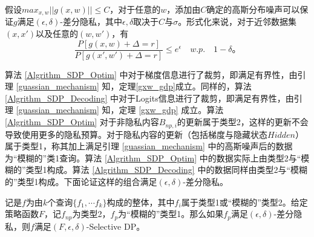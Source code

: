 \begin{theorem}
	\label{gxw_gdp}
	假设$max_{x,w}||g(x,w)||\leq C$，对于任意的$w$，添加由$C$确定的高斯分布噪声可以保证$g$满足$(\epsilon, \delta)$-差分隐私，其中$\epsilon, \delta$取决于$C$与$\sigma$。形式化来说，对于近邻数据集$(x, x')$以及任意的$(w, w')$，有
	$$\frac{P[g(x,w) + \Delta = r]}{P[g(x',w') + \Delta = r]}\leq e^\epsilon \quad w.p.\quad1-\delta\text{。}$$
\end{theorem}

算法 \ref{Algrithm_SDP_Optim} 中对于梯度信息进行了裁剪，即满足有界性，由引理 \ref{guassian_mechanism} 知，定理\ref{gxw_gdp}成立。同样的，算法 \ref{Algrithm_SDP_Decoding} 中对于Logits信息进行了裁剪，即满足有界性，由引理 \ref{guassian_mechanism} 知，定理 \ref{gxw_gdp} 成立。算法 \ref{Algrithm_SDP_Optim} 对于非隐私内容$B_{np,i}$的更新属于类型2，这样的更新不会导致使用更多的隐私预算。对于隐私内容的更新（包括梯度与隐藏状态$Hidden$）属于类型1，称其加上满足引理 \ref{guassian_mechanism} 中的高斯噪声后的数据为“模糊的”类1查询。算法 \ref{Algrithm_SDP_Optim} 中的数据实际上由类型2与“模糊的”类型1构成。算法 \ref{Algrithm_SDP_Decoding} 中的数据同样由类型2与“模糊的”类型1构成。下面论证这样的组合满足$(\epsilon, \delta)$-差分隐私。

\begin{theorem}
	\label{gxw_gdp}
	记是$f$为由$k$个查询$\{f_1,\cdots f_k\}$构成的整体，其中$f_i$属于类型1或“模糊的”类型2。给定策略函数$F$，记$f_{np}$为类型2，$f_p$为“模糊的”类型1。那么如果$f_p$满足$(\epsilon, \delta)$-差分隐私，则$f$满足$(F,ϵ,δ)$-Selective DP。
\end{theorem}



